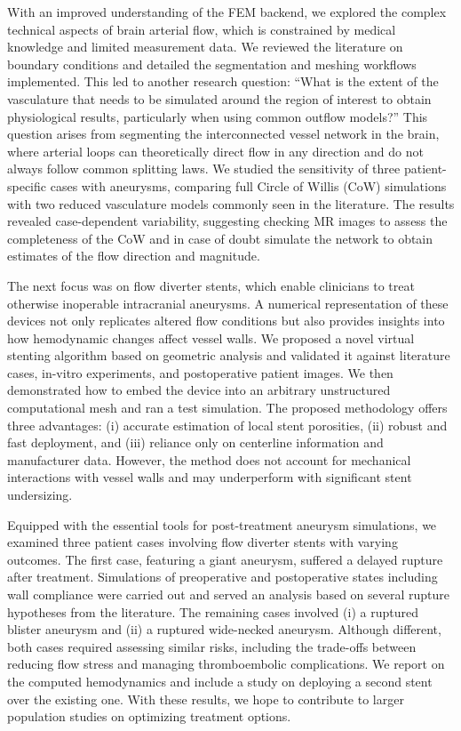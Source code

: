 With an improved understanding of the FEM backend, we explored the complex technical aspects of brain arterial flow, which is constrained by medical knowledge and limited measurement data. We reviewed the literature on boundary conditions and detailed the segmentation and meshing workflows implemented. This led to another research question: ``What is the extent of the vasculature that needs to be simulated around the region of interest to obtain physiological results, particularly when using common outflow models?'' This question arises from segmenting the interconnected vessel network in the brain, where arterial loops can theoretically direct flow in any direction and do not always follow common splitting laws. We studied the sensitivity of three patient-specific cases with aneurysms, comparing full Circle of Willis (CoW) simulations with two reduced vasculature models commonly seen in the literature. The results revealed case-dependent variability, suggesting checking MR images to assess the completeness of the CoW and in case of doubt simulate the network to obtain estimates of the flow direction and magnitude.

The next focus was on flow diverter stents, which enable clinicians to treat otherwise inoperable intracranial aneurysms. A numerical representation of these devices not only replicates altered flow conditions but also provides insights into how hemodynamic changes affect vessel walls. We proposed a novel virtual stenting algorithm based on geometric analysis and validated it against literature cases, in-vitro experiments, and postoperative patient images. We then demonstrated how to embed the device into an arbitrary unstructured computational mesh and ran a test simulation. The proposed methodology offers three advantages: (i) accurate estimation of local stent porosities, (ii) robust and fast deployment, and (iii) reliance only on centerline information and manufacturer data. However, the method does not account for mechanical interactions with vessel walls and may underperform with significant stent undersizing.

Equipped with the essential tools for post-treatment aneurysm simulations, we examined three patient cases involving flow diverter stents with varying outcomes. The first case, featuring a giant aneurysm, suffered a delayed rupture after treatment. Simulations of preoperative and postoperative states including wall compliance were carried out and served an analysis based on several rupture hypotheses from the literature. The remaining cases involved (i) a ruptured blister aneurysm and (ii) a ruptured wide-necked aneurysm. Although different, both cases required assessing similar risks, including the trade-offs between reducing flow stress and managing thromboembolic complications. We report on the computed hemodynamics and include a study on deploying a second stent over the existing one. With these results, we hope to contribute to larger population studies on optimizing treatment options.


